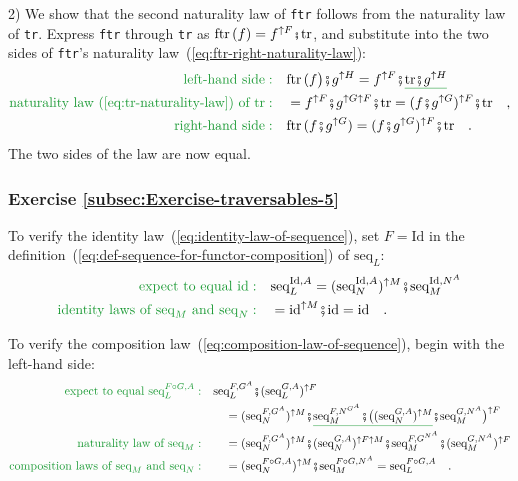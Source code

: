2) We show that the second naturality law of \lstinline!ftr! follows
from the naturality law of \lstinline!tr!. Express \lstinline!ftr!
through \lstinline!tr! as $\text{ftr}\,(f)=f^{\uparrow F}\bef\text{tr}$,
and substitute into the two sides of \lstinline!ftr!\textsf{'}s naturality
law~(\ref{eq:ftr-right-naturality-law}): 
\begin{align*}
{\color{greenunder}\text{left-hand side}:}\quad & \text{ftr}\,(f\big)\bef g^{\uparrow H}=f^{\uparrow F}\bef\gunderline{\text{tr}\bef g^{\uparrow H}}\\
{\color{greenunder}\text{naturality law~(\ref{eq:tr-naturality-law}) of }\text{tr}:}\quad & =f^{\uparrow F}\bef g^{\uparrow G\uparrow F}\bef\text{tr}=(f\bef g^{\uparrow G})^{\uparrow F}\bef\text{tr}\quad,\\
{\color{greenunder}\text{right-hand side}:}\quad & \text{ftr}\,(f\bef g^{\uparrow G})=(f\bef g^{\uparrow G})^{\uparrow F}\bef\text{tr}\quad.
\end{align*}
The two sides of the law are now equal.

\subsubsection*{Exercise \ref{subsec:Exercise-traversables-5}}

To verify the identity law~(\ref{eq:identity-law-of-sequence}),
set $F=\text{Id}$ in the definition~(\ref{eq:def-sequence-for-functor-composition})
of $\text{seq}_{L}$:
\begin{align*}
{\color{greenunder}\text{expect to equal }\text{id}:}\quad & \text{seq}_{L}^{\text{Id},A}=(\text{seq}_{N}^{\text{Id},A})^{\uparrow M}\bef\text{seq}_{M}^{\text{Id},N^{A}}\\
{\color{greenunder}\text{identity laws of }\text{seq}_{M}\text{ and }\text{seq}_{N}:}\quad & =\text{id}^{\uparrow M}\bef\text{id}=\text{id}\quad.
\end{align*}

To verify the composition law~(\ref{eq:composition-law-of-sequence}),
begin with the left-hand side:
\begin{align*}
{\color{greenunder}\text{expect to equal }\text{seq}_{L}^{F\circ G,A}:}\quad & \text{seq}_{L}^{F,G^{A}}\bef(\text{seq}_{L}^{G,A})^{\uparrow F}\\
 & \quad=(\text{seq}_{N}^{F,G^{A}})^{\uparrow M}\bef\gunderline{\text{seq}_{M}^{F,N^{G^{A}}}\bef\big((\text{seq}_{N}^{G,A})^{\uparrow M}}\bef\text{seq}_{M}^{G,N^{A}}\big)^{\uparrow F}\\
{\color{greenunder}\text{naturality law of }\text{seq}_{M}:}\quad & \quad=(\text{seq}_{N}^{F,G^{A}})^{\uparrow M}\bef(\text{seq}_{N}^{G,A})^{\uparrow F\uparrow M}\bef\text{seq}_{M}^{F,G^{N^{A}}}\bef(\text{seq}_{M}^{G,N^{A}})^{\uparrow F}\\
{\color{greenunder}\text{composition laws of }\text{seq}_{M}\text{ and }\text{seq}_{N}:}\quad & \quad=(\text{seq}_{N}^{F\circ G,A})^{\uparrow M}\bef\text{seq}_{M}^{F\circ G,N^{A}}=\text{seq}_{L}^{F\circ G,A}\quad.
\end{align*}


